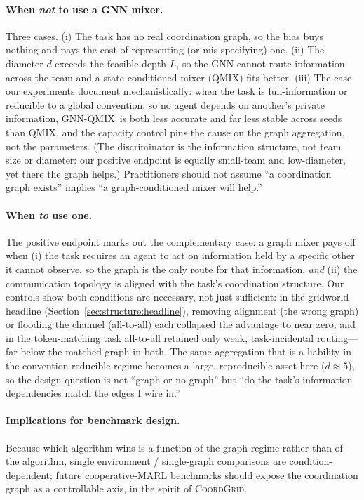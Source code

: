 \documentclass[manuscript, screen, review]{jair}
\newcommand{\algoname}[1]{\textsc{#1}}
\newcommand{\qmix}{\algoname{QMIX}}
\newcommand{\gnnqmix}{\algoname{GNN-QMIX}}
\newcommand{\coordgrid}{\textsc{CoordGrid}}
\begin{document}
\paragraph{When \emph{not} to use a GNN mixer.} Three cases. (i) The task
has no real coordination graph, so the bias buys nothing and pays the cost
of representing (or mis-specifying) one. (ii) The diameter $d$ exceeds the
feasible depth $L$, so the GNN cannot route information across the team and
a state-conditioned mixer (\qmix) fits better. (iii) The case our
experiments document mechanistically: when the task is full-information or
reducible to a global convention, so no agent depends on another's private
information, \gnnqmix\ is both less accurate and far less stable across seeds
than \qmix, and the capacity control pins the cause on the graph aggregation,
not the parameters. (The discriminator is the information structure, not team
size or diameter: our positive endpoint is equally small-team and
low-diameter, yet there the graph helps.) Practitioners should not assume ``a
coordination graph exists'' implies ``a graph-conditioned mixer will
help.''

\paragraph{When \emph{to} use one.} The positive endpoint marks out the
complementary case: a graph mixer pays off when (i) the task requires an
agent to act on information held by a specific other it cannot observe, so
the graph is the only route for that information, \emph{and} (ii) the
communication topology is aligned with the task's coordination structure. Our
controls show both conditions are necessary, not just sufficient: in the
gridworld headline (Section~\ref{sec:structure:headline}), removing alignment
(the wrong graph) or flooding the channel (all-to-all) each collapsed the
advantage to near zero, and in the token-matching task all-to-all retained only
weak, task-incidental routing---far below the matched graph in both. The same aggregation that is a
liability in the convention-reducible regime becomes a large, reproducible
asset here ($d\approx5$), so the design question is not ``graph or no graph''
but ``do the task's information dependencies match the edges I wire in.''

\paragraph{Implications for benchmark design.} Because which algorithm wins
is a function of the graph regime rather than of the algorithm, single
environment / single-graph comparisons are condition-dependent; future
cooperative-MARL benchmarks should expose the coordination graph as a
controllable axis, in the spirit of \coordgrid.
\end{document}
